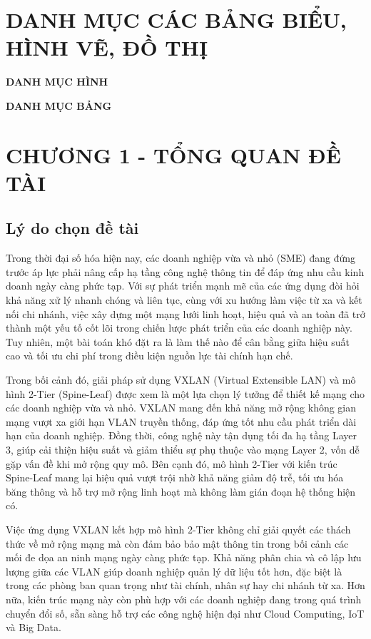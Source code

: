 \documentclass[13pt]{article}
\begin{document}
\section*{DANH MỤC CÁC BẢNG BIỂU, HÌNH VẼ, ĐỒ THỊ}
\textbf{DANH MỤC HÌNH}\\
\renewcommand{\listfigurename}{}
\listoffigures

\newpage
\textbf{DANH MỤC BẢNG}\\
\renewcommand{\listtablename}{}
\listoftables

\newpage

\setcounter{section}{1} %
\section*{CHƯƠNG 1 - TỔNG QUAN ĐỀ TÀI}
    \subsection{Lý do chọn đề tài}
        Trong thời đại số hóa hiện nay, các doanh nghiệp vừa và nhỏ (SME) đang đứng trước áp lực phải nâng cấp hạ tầng công nghệ thông tin để đáp ứng nhu cầu kinh doanh ngày càng phức tạp. Với sự phát triển mạnh mẽ của các ứng dụng đòi hỏi khả năng xử lý nhanh chóng và liên tục, cùng với xu hướng làm việc từ xa và kết nối chi nhánh, việc xây dựng một mạng lưới linh hoạt, hiệu quả và an toàn đã trở thành một yếu tố cốt lõi trong chiến lược phát triển của các doanh nghiệp này. Tuy nhiên, một bài toán khó đặt ra là làm thế nào để cân bằng giữa hiệu suất cao và tối ưu chi phí trong điều kiện nguồn lực tài chính hạn chế.

        Trong bối cảnh đó, giải pháp sử dụng VXLAN (Virtual Extensible LAN) và mô hình 2-Tier (Spine-Leaf) được xem là một lựa chọn lý tưởng để thiết kế mạng cho các doanh nghiệp vừa và nhỏ. VXLAN mang đến khả năng mở rộng không gian mạng vượt xa giới hạn VLAN truyền thống, đáp ứng tốt nhu cầu phát triển dài hạn của doanh nghiệp. Đồng thời, công nghệ này tận dụng tối đa hạ tầng Layer 3, giúp cải thiện hiệu suất và giảm thiểu sự phụ thuộc vào mạng Layer 2, vốn dễ gặp vấn đề khi mở rộng quy mô. Bên cạnh đó, mô hình 2-Tier với kiến trúc Spine-Leaf mang lại hiệu quả vượt trội nhờ khả năng giảm độ trễ, tối ưu hóa băng thông và hỗ trợ mở rộng linh hoạt mà không làm gián đoạn hệ thống hiện có.

        Việc ứng dụng VXLAN kết hợp mô hình 2-Tier không chỉ giải quyết các thách thức về mở rộng mạng mà còn đảm bảo bảo mật thông tin trong bối cảnh các mối đe dọa an ninh mạng ngày càng phức tạp. Khả năng phân chia và cô lập lưu lượng giữa các VLAN giúp doanh nghiệp quản lý dữ liệu tốt hơn, đặc biệt là trong các phòng ban quan trọng như tài chính, nhân sự hay chi nhánh từ xa. Hơn nữa, kiến trúc mạng này còn phù hợp với các doanh nghiệp đang trong quá trình chuyển đổi số, sẵn sàng hỗ trợ các công nghệ hiện đại như Cloud Computing, IoT và Big Data.
\end{document}
